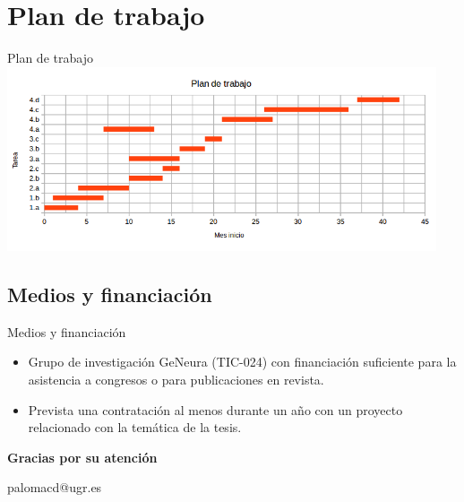 \documentclass{beamer}
\begin{document}
\section{Plan de trabajo}

\begin{frame}{Plan de trabajo}
\includegraphics[width=0.95\textwidth]{./imgs/especiedegantt.png}
\end{frame}

\subsection{Medios y financiación}

\begin{frame}{Medios y financiación}

\begin{itemize}
  \item Grupo de investigación GeNeura (TIC-024) con financiación suficiente para la asistencia a congresos o para publicaciones en revista.
  \item Prevista una contratación al menos durante un año con un proyecto relacionado con la temática de la tesis.
\end{itemize}

\end{frame}

\begin{frame}
  \begin{center}
  {\large \textbf{Gracias por su atención}}
  
  palomacd@ugr.es
  \end{center}
\end{frame}
\end{document}
